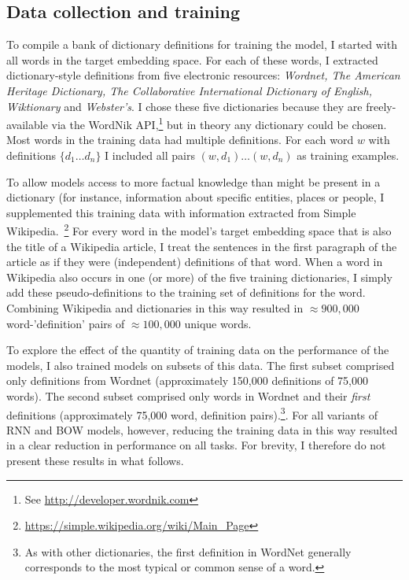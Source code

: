 \subsection{Data collection and training}

To compile a bank of dictionary definitions for training the model, I started with all words in the target embedding space. For each of these words, I extracted dictionary-style definitions from five electronic resources: \emph{Wordnet, The American Heritage Dictionary, The Collaborative International Dictionary of English, Wiktionary} and \emph{Webster's}. I chose these five dictionaries because they are freely-available via the WordNik API,\footnote{See \url{http://developer.wordnik.com}} but in theory any dictionary could be chosen. Most words in the training data had multiple definitions. For each word \(w\) with definitions \( \{d_1 \dots d_n\} \) I included all pairs \((w, d_1) \dots (w,d_n) \) as training examples. 

To allow models access to more factual knowledge than might be present in a dictionary (for instance, information about specific entities, places or people, I supplemented this training data with information extracted from Simple Wikipedia.~\footnote{\url{https://simple.wikipedia.org/wiki/Main_Page}} For every word in the model's target embedding space that is also the title of a Wikipedia article, I treat the sentences in the first paragraph of the article as if they were (independent) definitions of that word. When a word in Wikipedia also occurs in one (or more) of the five training dictionaries, I simply add these pseudo-definitions to the training set of definitions for the word. Combining Wikipedia and dictionaries in this way resulted in \(\approx 900,000\) word-'definition' pairs of \(\approx 100,000\) unique words. 

To explore the effect of the quantity of training data on the performance of the models, I also trained models on subsets of this data. The first subset comprised only definitions from Wordnet (approximately 150,000 definitions of 75,000 words). The second subset comprised only words in Wordnet and their \emph{first} definitions (approximately 75,000 word, definition pairs).\footnote{As with other dictionaries, the first definition in WordNet generally corresponds to the most typical or common sense of a word.}. For all variants of RNN and BOW models, however, reducing the training data in this way resulted in a clear reduction in performance on all tasks. For brevity, I therefore do not present these results in what follows.  

